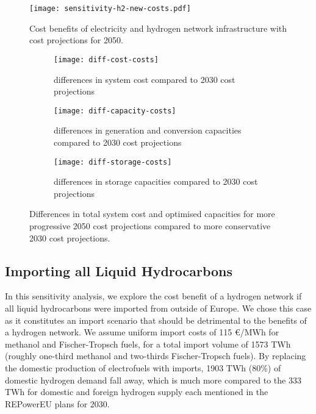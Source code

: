 \begin{SCfigure}
    \centering
    \texttt{[image: sensitivity-h2-new-costs.pdf]}
    \caption{Cost benefits of electricity and hydrogen network infrastructure with cost projections for 2050.}
    \label{fig:sensitivity-costs}
\end{SCfigure}

\begin{figure}
    \centering
    \begin{subfigure}[t]{\textwidth}
        \centering
        \caption{differences in system cost compared to 2030 cost projections}
        \texttt{[image: diff-cost-costs]}
        \label{fig:sensitivity-costs-cost}
    \end{subfigure}
    \begin{subfigure}[t]{\textwidth}
        \centering
        \caption{differences in generation and conversion capacities compared to 2030 cost projections}
        \texttt{[image: diff-capacity-costs]}
        \label{fig:sensitivity-costs-cap}
    \end{subfigure}
    \begin{subfigure}[t]{\textwidth}
        \centering
        \caption{differences in storage capacities compared to 2030 cost projections}
        \texttt{[image: diff-storage-costs]}
        \label{fig:sensitivity-costs-sto}
    \end{subfigure}
    \caption{Differences in total system cost and optimised capacities for more progressive 2050 cost projections compared to more conservative 2030 cost projections.}
    \label{fig:sensitivity-costs-diff}
\end{figure}


\subsection{Importing all Liquid Hydrocarbons}
\label{sec:si:sensitivity-imports}

In this sensitivity analysis, we explore the cost benefit of a hydrogen network
if all liquid hydrocarbons were imported from outside of Europe. We chose this
case as it constitutes an import scenario that should be detrimental to the
benefits of a hydrogen network. We assume uniform import costs of 115
\euro/MWh for
methanol and Fischer-Tropsch fuels, for a total import volume of 1573 TWh
(roughly one-third methanol and two-thirds Fischer-Tropsch fuels). By replacing the
domestic production of electrofuels with imports, 1903 TWh (80\%) of domestic
hydrogen demand fall away, which is much more compared to the 333 TWh for
domestic and foreign hydrogen supply each mentioned in the REPowerEU plans for
2030.

